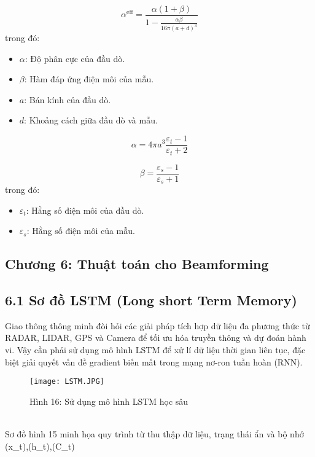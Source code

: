 \documentclass[a4paper,13pt]{article}
\begin{document}
\begin{equation}
\alpha^{\text{eff}} = \frac{\alpha (1 + \beta)}{1 - \frac{\alpha \beta}{16 \pi (a + d)^3}} \tag{9}\label{eq:effective_polarizability}
\end{equation}
trong đó:
\begin{itemize}
    \item \( \alpha \): Độ phân cực của đầu dò.
    \item \( \beta \): Hàm đáp ứng điện môi của mẫu.
    \item \( a \): Bán kính của đầu dò.
    \item \( d \): Khoảng cách giữa đầu dò và mẫu.
\end{itemize} 

\begin{equation}
\alpha = 4 \pi a^3 \frac{\varepsilon_t - 1}{\varepsilon_t + 2} \tag{10}\label{eq:polarizability}
\end{equation}

\begin{equation}
\beta = \frac{\varepsilon_s - 1}{\varepsilon_s + 1} \tag{11}\label{eq:dielectric_response}
\end{equation}
trong đó:
\begin{itemize}
    \item \( \varepsilon_t \): Hằng số điện môi của đầu dò.
    \item \( \varepsilon_s \): Hằng số điện môi của mẫu.
\end{itemize}


\clearpage
\begin{center}
    \section{Chương 6: Thuật toán cho Beamforming}
\end{center}

\subsection{6.1 Sơ đồ LSTM (Long short Term Memory)}
Giao thông thông minh đòi hỏi các giải pháp tích hợp dữ liệu đa phương thức từ RADAR, LIDAR, GPS và Camera để tối ưu hóa truyền thông và dự đoán hành vi. Vậy cần phải sử dụng mô hình LSTM để xử lí dữ liệu thời gian liên tục, đặc biệt giải quyết vấn đề gradient biến mất trong mạng nơ-ron tuần hoàn (RNN). 
\begin{figure}[htbp]
    \centering
    \texttt{[image: LSTM.JPG]}
    \caption*{Hình 16: Sử dụng mô hình LSTM học sâu }
    \label{fig:model}
\end{figure}\\
Sơ đồ hình 15 minh họa quy trình từ thu thập dữ liệu, trạng thái ẩn và bộ nhớ (x_t),(h_t),(C_t) \\
\end{document}

